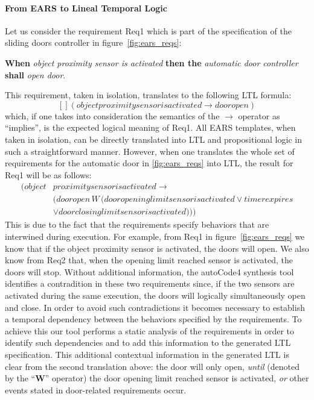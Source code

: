 \paragraph{\textbf{From EARS to Lineal Temporal Logic}\\}
\label{sec:ears_LTL} 
\vspace{-0cm}
Let us consider the requirement \textsf{Req1} which is part of the
specification of the sliding doors controller in figure~\ref{fig:ears_reqs}:
\begin{center}
\textbf{When} \emph{object proximity sensor is activated} \textbf{then the} \emph{automatic door controller} \textbf{shall}
\emph{open door}.
\end{center}
This requirement, taken in isolation, translates to the following LTL
 formula:
$$[] (objectproximitysensorisactivated \rightarrow dooropen)$$
which, if one takes into consideration the semantics of the $\rightarrow$
operator as ``implies'', is the expected logical meaning of \textsf{Req1}. All
EARS templates, when taken in isolation, can be directly translated into LTL and
propositional logic in such a straightforward manner. However, when one
translates the whole set of requirements for the automatic door in \ref{fig:ears_reqs} into
LTL, the result for \textsf{Req1} will be as follows:
\begin{align*}
[] (object&proximitysensorisactivated \rightarrow\\
 &(dooropen\,W\,(dooropeninglimitsensorisactivated \lor timerexpires\\
 & \lor doorclosinglimitsensorisactivated )))
\end{align*}
This is due to the fact that the requirements specify behaviors that are
interwined during execution. For example, from \textsf{Req1}  in
figure~\ref{fig:ears_reqs} we know that if the \textsf{object proximity sensor}
is activated, the doors will open. We also know from \textsf{Req2} that, when
the \textsf{opening limit reached} sensor is activated, the doors will stop.
Without additional information, the \textsf{autoCode4} synthesis tool identifies
a contradition in these two requirements since, if the two sensors are activated
during the same execution, the doors will logically simultaneously open and
close. In order to avoid such contradictions it becomes necessary to establish a
temporal dependency between the behaviors specified by the requirements. To
achieve this our tool performs a static analysis of the requirements in order to
identify such dependencies and to add this information to the generated LTL
specification. This additional contextual information in the generated LTL is
clear from the second translation above:
the door will only open, \emph{until} (denoted by the ``\textbf{W}'' operator)
the door \textsf{opening limit reached} sensor is activated, \emph{or} other events
stated in door-related requirements occur.\vspace{-.2cm}
